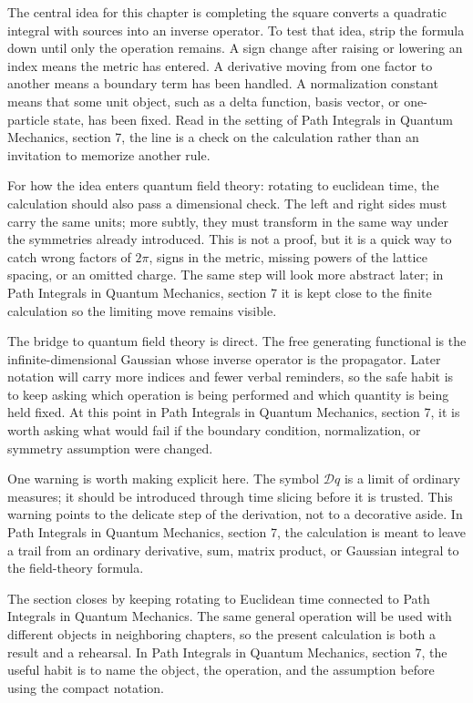 The central idea for this chapter is completing the square converts a quadratic integral with sources into an inverse operator.  To test that idea, strip the formula down until only the operation remains.  A sign change after raising or lowering an index means the metric has entered.  A derivative moving from one factor to another means a boundary term has been handled.  A normalization constant means that some unit object, such as a delta function, basis vector, or one-particle state, has been fixed.  Read in the setting of Path Integrals in Quantum Mechanics, section 7, the line is a check on the calculation rather than an invitation to memorize another rule.

For how the idea enters quantum field theory: rotating to euclidean time, the calculation should also pass a dimensional check.  The left and right sides must carry the same units; more subtly, they must transform in the same way under the symmetries already introduced.  This is not a proof, but it is a quick way to catch wrong factors of \(2\pi\), signs in the metric, missing powers of the lattice spacing, or an omitted charge.  The same step will look more abstract later; in Path Integrals in Quantum Mechanics, section 7 it is kept close to the finite calculation so the limiting move remains visible.

The bridge to quantum field theory is direct.  The free generating functional is the infinite-dimensional Gaussian whose inverse operator is the propagator.  Later notation will carry more indices and fewer verbal reminders, so the safe habit is to keep asking which operation is being performed and which quantity is being held fixed.  At this point in Path Integrals in Quantum Mechanics, section 7, it is worth asking what would fail if the boundary condition, normalization, or symmetry assumption were changed.

One warning is worth making explicit here.  The symbol \(\mathcal D q\) is a limit of ordinary measures; it should be introduced through time slicing before it is trusted.  This warning points to the delicate step of the derivation, not to a decorative aside.  In Path Integrals in Quantum Mechanics, section 7, the calculation is meant to leave a trail from an ordinary derivative, sum, matrix product, or Gaussian integral to the field-theory formula.

The section closes by keeping rotating to Euclidean time connected to Path Integrals in Quantum Mechanics.  The same general operation will be used with different objects in neighboring chapters, so the present calculation is both a result and a rehearsal.  In Path Integrals in Quantum Mechanics, section 7, the useful habit is to name the object, the operation, and the assumption before using the compact notation.



